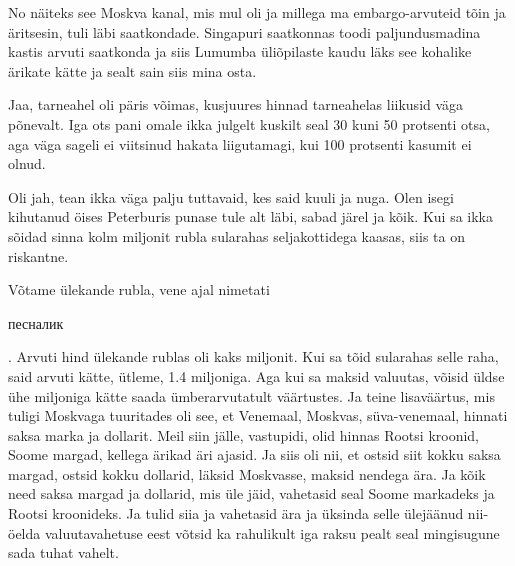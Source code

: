
No näiteks see Moskva kanal, mis mul oli ja millega ma embargo-arvuteid tõin ja 
äritsesin, tuli läbi saatkondade. Singapuri saatkonnas toodi paljundusmadina 
kastis arvuti saatkonda ja siis Lumumba üliõpilaste 
kaudu läks see kohalike ärikate kätte ja sealt sain siis mina osta. 


Jaa, tarneahel oli päris võimas, kusjuures hinnad tarneahelas liikusid väga 
põnevalt. Iga ots pani omale ikka julgelt kuskilt seal 30 kuni 50 protsenti 
otsa, aga väga sageli ei viitsinud hakata liigutamagi, kui 100 protsenti 
kasumit ei olnud. 


Oli jah, tean ikka väga palju tuttavaid, kes said kuuli ja nuga. Olen isegi 
kihutanud öises Peterburis punase tule alt läbi, sabad järel ja kõik. Kui sa 
ikka sõidad sinna kolm miljonit rubla sularahas seljakottidega kaasas, siis ta 
on riskantne.

Võtame ülekande rubla, vene ajal nimetati \begin{russian}песналик\end{russian}. 
Arvuti hind ülekande rublas oli kaks miljonit. Kui sa tõid sularahas selle 
raha, said arvuti kätte, ütleme, 1.4 miljoniga. Aga kui sa maksid valuutas, 
võisid üldse  ühe miljoniga kätte saada ümberarvutatult väärtustes. Ja teine 
lisaväärtus, mis tuligi  Moskvaga tuuritades oli see, et Venemaal, Moskvas, 
süva-venemaal, hinnati saksa marka ja  dollarit. Meil siin jälle, vastupidi, 
olid hinnas Rootsi kroonid, Soome margad, kellega ärikad äri ajasid. Ja siis 
oli nii, et ostsid siit kokku saksa margad, ostsid kokku dollarid, läksid 
Moskvasse, maksid nendega ära. Ja kõik need saksa margad ja dollarid, mis üle 
jäid,  vahetasid seal Soome markadeks ja Rootsi kroonideks. Ja tulid siia ja 
vahetasid ära ja üksinda selle ülejäänud nii-öelda valuutavahetuse eest võtsid 
ka rahulikult iga raksu pealt seal mingisugune sada tuhat vahelt. 

